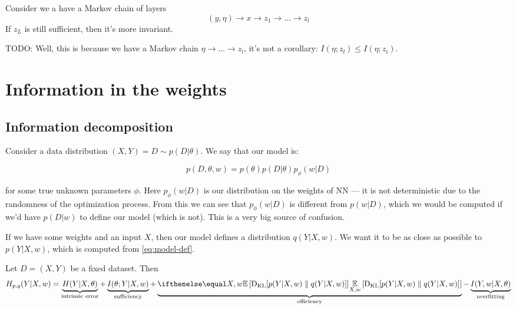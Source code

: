 \documentclass{article}
\begin{document}
\begin{corollary}
Consider we a have a Markov chain of layers
\[
(y,\eta) \to x \to z_1 \to ... \to z_l
\]
If $z_L$ is still sufficient, then it's more invariant.
\end{corollary}

TODO:
Well, this is because we have a Markov chain $\eta \to ... \to z_l$, it's not a corollary:
$I(\eta; z_l) \leq I(\eta; z_i)$.

\section{Information in the weights}
\subsection*{Information decomposition}
Consider a data distribution $(X,Y) = D \sim p(D|\theta)$.
We say that our model is:

\begin{equation}\label{eq:model-def}
p(D, \theta, w) = p(\theta) p(D|\theta) p_\phi(w| D)
\end{equation}

for some true unknown parameters $\phi$.
Here $p_\phi(w|D)$ is our distribution on the weights of NN --- it is not deterministic due to the randomness of the optimization process.
From this we can see that $p_\phi(w|D)$ is different from $p(w|D)$, which we would be computed if we'd have $p(D|w)$ to define our model (which is not).
This is a very big source of confusion.

If we have some weights and an input $X$, then our model defines a distribution $q(Y|X,w)$.
We want it to be as close as possible to $p(Y|X,w)$, which is computed from \eqref{eq:model-def}.

\begin{theorem}
Let $D = (X,Y)$ be a fixed dataset.
Then
\begin{equation}
H_{p,q}(Y|X,w) = \underbrace{H(Y|X,\theta)}_{\text{intrinsic error}} + \underbrace{I(\theta; Y | X,w)}_{\text{sufficiency}} + \underbrace{\expect[X,w]{\kl{p(Y|X,w)}{q(Y|X,w)}}}_{\text{efficiency}} - \underbrace{I(Y,w|X,\theta)}_{\text{overfitting}}
\end{equation}
\end{theorem}
\end{document}
